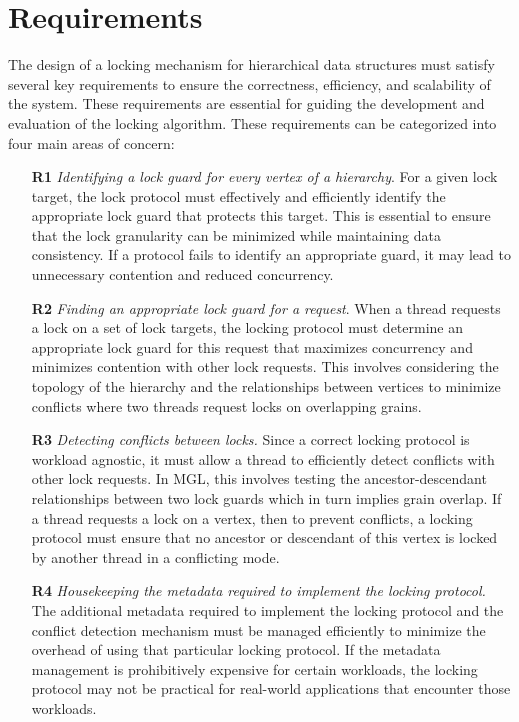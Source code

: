 
\section{Requirements} \label{sec:requirements}

The design of a locking mechanism for hierarchical data structures must satisfy several key requirements to ensure the correctness, efficiency, and scalability of the system. These requirements are essential for guiding the development and evaluation of the locking algorithm. 
These requirements can be categorized into four main areas of concern:

\begin{itemize}
    \item[\textbf{R1}] \emph{Identifying a lock guard for every vertex of a hierarchy}. For a given lock target, the lock protocol must effectively and efficiently identify the appropriate lock guard that protects this target. This is essential to ensure that the lock granularity can be minimized while maintaining data consistency. If a protocol fails to identify an appropriate guard, it may lead to unnecessary contention and reduced concurrency.

    \item[\textbf{R2}] \emph{Finding an appropriate lock guard for a request}. When a thread requests a lock on a set of lock targets, the locking protocol must determine an appropriate lock guard for this request that maximizes concurrency and minimizes contention with other lock requests. This involves considering the topology of the hierarchy and the relationships between vertices to minimize conflicts where two threads request locks on overlapping grains.
    
    \item[\textbf{R3}] \emph{Detecting conflicts between locks.} Since a correct locking protocol is workload agnostic, it must allow a thread to efficiently detect conflicts with other lock requests. In MGL, this involves testing the ancestor-descendant relationships between two lock guards which in turn implies grain overlap. If a thread requests a lock on a vertex, then to prevent conflicts, a locking protocol must ensure that no ancestor or descendant of this vertex is locked by another thread in a conflicting mode. 
    
    \item[\textbf{R4}] \emph{Housekeeping the metadata required to implement the locking protocol.} The additional metadata required to implement the locking protocol and the conflict detection mechanism must be managed efficiently to minimize the overhead of using that particular locking protocol. If the metadata management is prohibitively expensive for certain workloads, the locking protocol may not be practical for real-world applications that encounter those workloads. 
\end{itemize}

